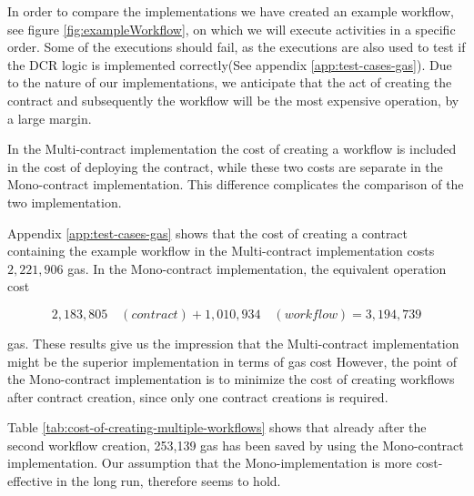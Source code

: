 \documentclass{article}
\begin{document}
	In order to compare the implementations we have created an example workflow, see figure \ref{fig:exampleWorkflow}, on which we will execute activities in a specific order. Some of the executions should fail, as the executions are also used to test if the DCR logic is implemented correctly(See appendix \ref{app:test-cases-gas}).
	Due to the nature of our implementations, we anticipate that the act of creating the contract and subsequently the workflow will be the most expensive operation, by a large margin.

	In the Multi-contract implementation the cost of creating a workflow is included in the cost of deploying the contract, while these two costs are separate in the Mono-contract implementation.
	This difference complicates the comparison of the two implementation.

	Appendix \ref{app:test-cases-gas} shows that the cost of creating a contract containing the example workflow in the Multi-contract implementation costs $2,221,906$ gas.
	In the Mono-contract implementation, the equivalent operation cost 

	$$2,183,805\quad(contract) + 1,010,934\quad(workflow) = 3,194,739$$

	\noindent gas. These results give us the impression that the Multi-contract implementation might be the superior implementation in terms of gas cost
	However, the point of the Mono-contract implementation is to minimize the cost of creating workflows after contract creation, since only one contract creations is required. 

	Table \ref{tab:cost-of-creating-multiple-workflows} shows that already after the second workflow creation, 253,139 gas has been saved by using the Mono-contract implementation.
	Our assumption that the Mono-implementation is more cost-effective in the long run, therefore seems to hold.  
\end{document}
